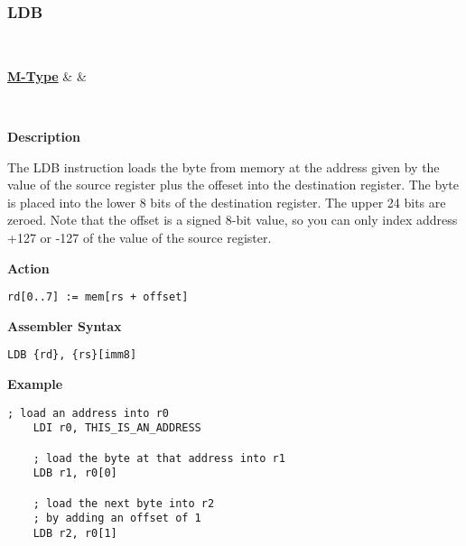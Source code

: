 \subsubsection{LDB }\label{sec:LDB}

\vspace{3ex}

\begin{center}
	\begin{bytefield}[leftcurly=., leftcurlyspace=0pt]{32}
		 \\
		\begin{leftwordgroup}{\hyperref[sec:m-type]{\textbf{M-Type}}}
		 & 
		 &
		\end{leftwordgroup}\\
	\end{bytefield}
\end{center}

\textbf{Description}

The LDB instruction loads the byte from memory at the address given by the value of the source register plus the offeset into the destination register.
The byte is placed into the lower 8 bits of the destination register. The upper 24 bits are zeroed.
Note that the offset is a signed 8-bit value, so you can only index address +127 or -127 of the value of the source register.

\vspace{3ex}

\textbf{Action}
\begin{lstlisting}[frame=single]
	rd[0..7] := mem[rs + offset]
\end{lstlisting}

\vspace{3ex}

\textbf{Assembler Syntax}
\begin{lstlisting}[frame=single]
	LDB {rd}, {rs}[imm8]
\end{lstlisting}

\vspace{3ex}

\textbf{Example}
\begin{lstlisting}[frame=single]
	; load an address into r0
	LDI r0, THIS_IS_AN_ADDRESS
	
	; load the byte at that address into r1
	LDB r1, r0[0]
	
	; load the next byte into r2
	; by adding an offset of 1
	LDB r2, r0[1]
\end{lstlisting}

